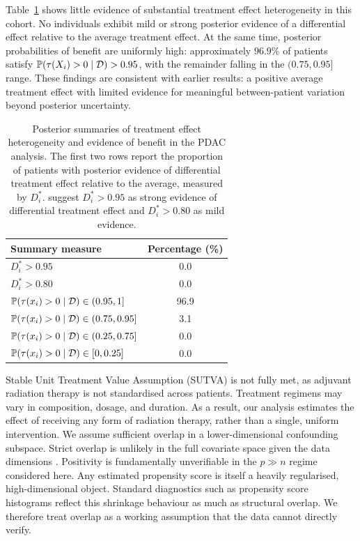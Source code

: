 Table~\ref{tab:pdac_heterogeneity_summary} shows little evidence of substantial treatment effect heterogeneity in this cohort. 
No individuals exhibit mild or strong posterior evidence of a differential effect relative to the average treatment effect. 
At the same time, posterior probabilities of benefit are uniformly high: approximately $96.9\%$ of patients satisfy $\mathbb{P}(\tau(X_i) > 0 \mid \mathcal D) > 0.95$, with the remainder falling in the $(0.75, 0.95]$ range. 
These findings are consistent with earlier results: a positive average treatment effect with limited evidence for meaningful between-patient variation beyond posterior uncertainty.



\begin{table}[b!]
\centering
\begin{tabular}{lc}
\toprule
Summary measure & Percentage (\%) \\
\midrule
$D_i^\ast > 0.95$ & 0.0 \\
$D_i^\ast > 0.80$ & 0.0 \\
$\mathbb{P}(\tau(x_i) > 0 \mid \mathcal D) \in (0.95, 1]$ & 96.9 \\
$\mathbb{P}(\tau(x_i) > 0 \mid \mathcal D) \in (0.75, 0.95]$ & 3.1 \\
$\mathbb{P}(\tau(x_i) > 0 \mid \mathcal D) \in (0.25, 0.75]$ & 0.0 \\
$\mathbb{P}(\tau(x_i) > 0 \mid \mathcal D) \in [0, 0.25]$ & 0.0 \\
\bottomrule
\end{tabular}
    \caption[Posterior summaries of treatment effect heterogeneity]{Posterior summaries of treatment effect heterogeneity and evidence of benefit in the PDAC analysis. The first two rows report the proportion of patients with posterior evidence of differential treatment effect relative to the average, measured by $D_i^\ast$. \citet{henderson2020individualized} suggest $D_i^\ast>0.95$ as strong evidence of differential treatment effect and $D_i^\ast>0.80$ as mild evidence.}
  \label{tab:pdac_heterogeneity_summary}
\end{table}

Stable Unit Treatment Value Assumption (SUTVA) is not fully met, as adjuvant radiation therapy is not standardised across patients.
Treatment regimens may vary in composition, dosage, and duration.
As a result, our analysis estimates the effect of receiving any form of radiation therapy, rather than a single, uniform intervention.
We assume sufficient overlap in a lower-dimensional confounding subspace. 
Strict overlap is unlikely in the full covariate space given the data dimensions \citep{DAmour2021Overlap}.
Positivity is fundamentally unverifiable in the $p \gg n$ regime considered here. 
Any estimated propensity score is itself a heavily regularised, high-dimensional object. 
Standard diagnostics such as propensity score histograms reflect this shrinkage behaviour as much as structural overlap. 
We therefore treat overlap as a working assumption that the data cannot directly verify.


